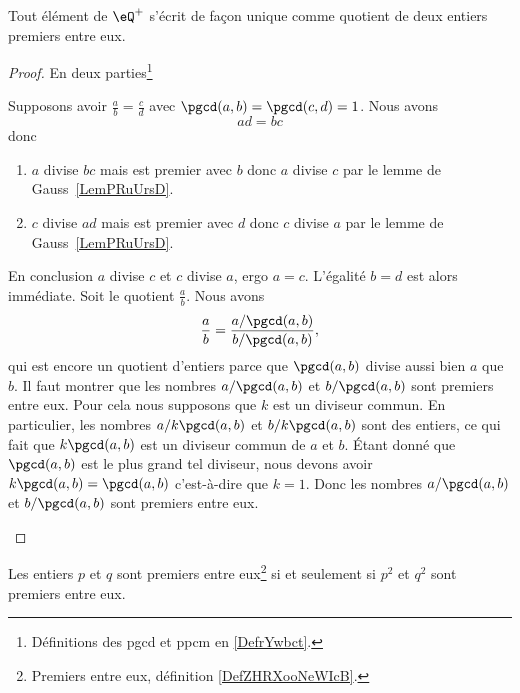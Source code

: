 \begin{theorem}     \label{THOooWYQVooRBaAAM}
	Tout élément de \( \eQ^+\) s'écrit de façon unique comme quotient de deux entiers premiers entre eux.
\end{theorem}

\begin{proof}
	En deux parties\footnote{Définitions des pgcd et ppcm en \ref{DefrYwbct}.}
	\begin{subproof}
		\spitem[Unicité]
		Supposons avoir \( \frac{ a }{ b }=\frac{ c }{ d }\) avec \( \pgcd(a,b)=\pgcd(c,d)=1\). Nous avons
		\begin{equation}
			ad=bc
		\end{equation}
		donc
		\begin{enumerate}
			\item
			      \( a\) divise \( bc\) mais est premier avec \( b\) donc \( a\) divise \( c\) par le lemme de Gauss~\ref{LemPRuUrsD}.
			\item
			      \( c\) divise \( ad\) mais est premier avec \( d\) donc \( c\) divise \( a\) par le lemme de Gauss~\ref{LemPRuUrsD}.
		\end{enumerate}
		En conclusion \( a\) divise \( c\) et \( c\) divise \( a\), ergo \( a=c\). L'égalité \( b=d\) est alors immédiate.
		\spitem[Existence]
		Soit le quotient \( \frac{ a }{ b }\). Nous avons
		\begin{equation}
			\frac{ a }{ b }=\frac{ a/\pgcd(a,b) }{ b/\pgcd(a,b) },
		\end{equation}
		qui est encore un quotient d'entiers parce que \( \pgcd(a,b)\) divise aussi bien \( a\) que \( b\). Il faut montrer que les nombres \( a/\pgcd(a,b)\) et \( b/\pgcd(a,b)\) sont premiers entre eux. Pour cela nous supposons que \( k\) est un diviseur commun. En particulier, les nombres \( a/k\pgcd(a,b)\) et \( b/k\pgcd(a,b)\) sont des entiers, ce qui fait que \( k\pgcd(a,b)\) est un diviseur commun de \( a\) et \( b\). Étant donné que \( \pgcd(a,b)\) est le plus grand tel diviseur, nous devons avoir \( k\pgcd(a,b)=\pgcd(a,b)\) c'est-à-dire que \( k=1\). Donc les nombres \( a/\pgcd(a,b)\) et \( b/\pgcd(a,b)\) sont premiers entre eux.
	\end{subproof}
\end{proof}

\begin{proposition}     \label{PROPooRZDDooLJabov}
    Les entiers \( p\) et \( q\) sont premiers entre eux\footnote{Premiers entre eux, définition \ref{DefZHRXooNeWIcB}.} si et seulement si \( p^2\) et \( q^2\) sont premiers entre eux.

\end{proposition}

